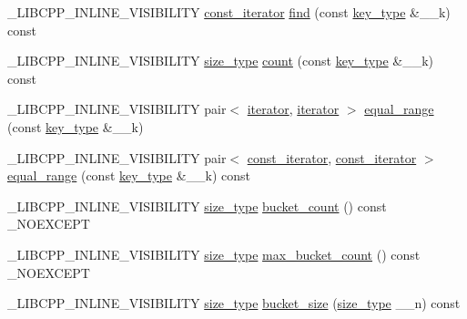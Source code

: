\begin{DoxyCompactItemize}
\+\_\+\+L\+I\+B\+C\+P\+P\+\_\+\+I\+N\+L\+I\+N\+E\+\_\+\+V\+I\+S\+I\+B\+I\+L\+I\+T\+Y \hyperlink{classunordered__multimap_a3cb373bd19680f9933781c04905fde39}{const\+\_\+iterator} \hyperlink{classunordered__multimap_acc9160aa6de1c01fae798677ec092dee}{find} (const \hyperlink{classunordered__multimap_a2902747087a03531493d30e9840f67d9}{key\+\_\+type} \&\+\_\+\+\_\+k) const 
\item 
\+\_\+\+L\+I\+B\+C\+P\+P\+\_\+\+I\+N\+L\+I\+N\+E\+\_\+\+V\+I\+S\+I\+B\+I\+L\+I\+T\+Y \hyperlink{classunordered__multimap_a977c4093df6d4d0302f280de19af4b58}{size\+\_\+type} \hyperlink{classunordered__multimap_aebbe635669fe205c8c8bf90ff0c89ef8}{count} (const \hyperlink{classunordered__multimap_a2902747087a03531493d30e9840f67d9}{key\+\_\+type} \&\+\_\+\+\_\+k) const 
\item 
\+\_\+\+L\+I\+B\+C\+P\+P\+\_\+\+I\+N\+L\+I\+N\+E\+\_\+\+V\+I\+S\+I\+B\+I\+L\+I\+T\+Y pair$<$ \hyperlink{classunordered__multimap_a7b508cae41ac3a258ca80609ec43db47}{iterator}, \hyperlink{classunordered__multimap_a7b508cae41ac3a258ca80609ec43db47}{iterator} $>$ \hyperlink{classunordered__multimap_a0c5296b9487a02b76d1aaa65dfab6cbf}{equal\+\_\+range} (const \hyperlink{classunordered__multimap_a2902747087a03531493d30e9840f67d9}{key\+\_\+type} \&\+\_\+\+\_\+k)
\item 
\+\_\+\+L\+I\+B\+C\+P\+P\+\_\+\+I\+N\+L\+I\+N\+E\+\_\+\+V\+I\+S\+I\+B\+I\+L\+I\+T\+Y pair$<$ \hyperlink{classunordered__multimap_a3cb373bd19680f9933781c04905fde39}{const\+\_\+iterator}, \hyperlink{classunordered__multimap_a3cb373bd19680f9933781c04905fde39}{const\+\_\+iterator} $>$ \hyperlink{classunordered__multimap_a440aba305d76b1353960416857f939f4}{equal\+\_\+range} (const \hyperlink{classunordered__multimap_a2902747087a03531493d30e9840f67d9}{key\+\_\+type} \&\+\_\+\+\_\+k) const 
\item 
\+\_\+\+L\+I\+B\+C\+P\+P\+\_\+\+I\+N\+L\+I\+N\+E\+\_\+\+V\+I\+S\+I\+B\+I\+L\+I\+T\+Y \hyperlink{classunordered__multimap_a977c4093df6d4d0302f280de19af4b58}{size\+\_\+type} \hyperlink{classunordered__multimap_a9131f5533a74340a675344de1ceb782d}{bucket\+\_\+count} () const \+\_\+\+N\+O\+E\+X\+C\+E\+P\+T
\item 
\+\_\+\+L\+I\+B\+C\+P\+P\+\_\+\+I\+N\+L\+I\+N\+E\+\_\+\+V\+I\+S\+I\+B\+I\+L\+I\+T\+Y \hyperlink{classunordered__multimap_a977c4093df6d4d0302f280de19af4b58}{size\+\_\+type} \hyperlink{classunordered__multimap_aa184d428f77dca5deb39a49d9e73d0fb}{max\+\_\+bucket\+\_\+count} () const \+\_\+\+N\+O\+E\+X\+C\+E\+P\+T
\item 
\+\_\+\+L\+I\+B\+C\+P\+P\+\_\+\+I\+N\+L\+I\+N\+E\+\_\+\+V\+I\+S\+I\+B\+I\+L\+I\+T\+Y \hyperlink{classunordered__multimap_a977c4093df6d4d0302f280de19af4b58}{size\+\_\+type} \hyperlink{classunordered__multimap_a2f17283316f81107b947d65a9f413302}{bucket\+\_\+size} (\hyperlink{classunordered__multimap_a977c4093df6d4d0302f280de19af4b58}{size\+\_\+type} \+\_\+\+\_\+n) const 

\end{DoxyCompactItemize}
